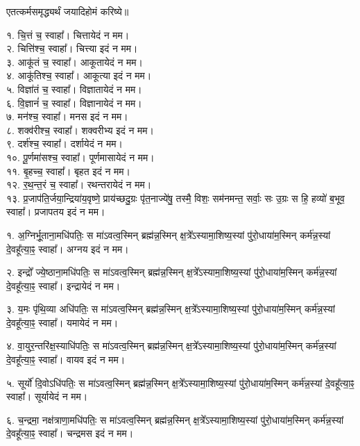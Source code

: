 
एतत्कर्मसमृद्ध्यर्थं जयादिहोमं करिष्ये॥

१. चि॒त्तं च॒ स्वाहा᳚। चित्तायेदं न मम।\\
२. चित्ति॑श्च॒ स्वाहा᳚। चित्त्या इदं न मम।\\
३. आकू॑तं च॒ स्वाहा᳚। आकूतायेदं न मम।\\
४. आकू॑तिश्च॒ स्वाहा᳚। आकूत्या इदं न मम।\\
५. विज्ञा॑तं च॒ स्वाहा᳚। विज्ञातायेदं न मम।\\
६. वि॒ज्ञानं॑ च॒ स्वाहा᳚। विज्ञानायेदं न मम।\\
७. मन॑श्च॒ स्वाहा᳚। मनस इदं न मम।\\
८. शक्व॑रीश्च॒ स्वाहा᳚। शक्वरीभ्य इदं न मम।\\
९. दर्श॑श्च॒ स्वाहा᳚। दर्शायेदं न मम।\\
१०. पू॒र्णमा॑सश्च॒ स्वाहा᳚। पूर्णमासायेदं न मम।\\
११. बृ॒हच्च॒ स्वाहा᳚। बृहत इदं न मम।\\
१२. र॒थ॒न्त॒रं च॒ स्वाहा᳚। रथन्तरायेदं न मम।\\
१३. प्र॒जाप॑ति॒र्जया॒न्द्रिया॑य॒वृष्णे॒ प्राय॑च्छदु॒ग्रः पृ॑त॒नाज्ये॑षु॒ तस्मै॒ विशः॒ सम॑नमन्त॒ सर्वाः॒ सः उ॒ग्रः स हि॒ हव्यो॑ ब॒भूव॒ स्वाहा᳚। प्रजापतय इदं न मम।\\

\clearpage

१. अ॒ग्निर्भू॒ताना॒मधि॑पतिः॒ स मा॑ऽवत्व॒स्मिन् ब्रह्म॑न्न॒स्मिन् क्ष॒त्रे᳚ऽस्यामा॒शिष्य॒स्यां पु॑रो॒धाया॑म॒स्मिन् कर्म॑न्न॒स्यां दे॒वहू᳚त्या॒ꣴ॒ स्वाहा᳚। अग्नय इदं न मम।

२. इन्द्रो᳚ ज्ये॒ष्ठाना॒मधि॑पतिः॒ स मा॑ऽवत्व॒स्मिन् ब्रह्म॑न्न॒स्मिन् क्ष॒त्रे᳚ऽस्यामा॒शिष्य॒स्यां पु॑रो॒धाया॑म॒स्मिन् कर्म॑न्न॒स्यां दे॒वहू᳚त्या॒ꣴ॒ स्वाहा᳚। इन्द्रायेदं न मम।

३. य॒मः पृ॑थि॒व्या अधि॑पतिः॒ स मा॑ऽवत्व॒स्मिन् ब्रह्म॑न्न॒स्मिन् क्ष॒त्रे᳚ऽस्यामा॒शिष्य॒स्यां पु॑रो॒धाया॑म॒स्मिन् कर्म॑न्न॒स्यां दे॒वहू᳚त्या॒ꣴ॒ स्वाहा᳚। यमायेदं न मम।

४. वा॒युर॒न्तरि॑क्ष॒स्याधि॑पतिः॒ स मा॑ऽवत्व॒स्मिन् ब्रह्म॑न्न॒स्मिन् क्ष॒त्रे᳚ऽस्यामा॒शिष्य॒स्यां पु॑रो॒धाया॑म॒स्मिन् कर्म॑न्न॒स्यां दे॒वहू᳚त्या॒ꣴ॒ स्वाहा᳚। वायव इदं न मम।

५. सूर्यो॑ दि॒वोऽधि॑पतिः॒ स मा॑ऽवत्व॒स्मिन् ब्रह्म॑न्न॒स्मिन् क्ष॒त्रे᳚ऽस्यामा॒शिष्य॒स्यां पु॑रो॒धाया॑म॒स्मिन् कर्म॑न्न॒स्यां दे॒वहू᳚त्या॒ꣴ॒ स्वाहा᳚। सूर्यायेदं न मम।

६. च॒न्द्रमा॒ नक्ष॑त्राणा॒मधि॑पतिः॒ स मा॑ऽवत्व॒स्मिन् ब्रह्म॑न्न॒स्मिन् क्ष॒त्रे᳚ऽस्यामा॒शिष्य॒स्यां पु॑रो॒धाया॑म॒स्मिन् कर्म॑न्न॒स्यां दे॒वहू᳚त्या॒ꣴ॒ स्वाहा᳚। चन्द्रमस इदं न मम।


